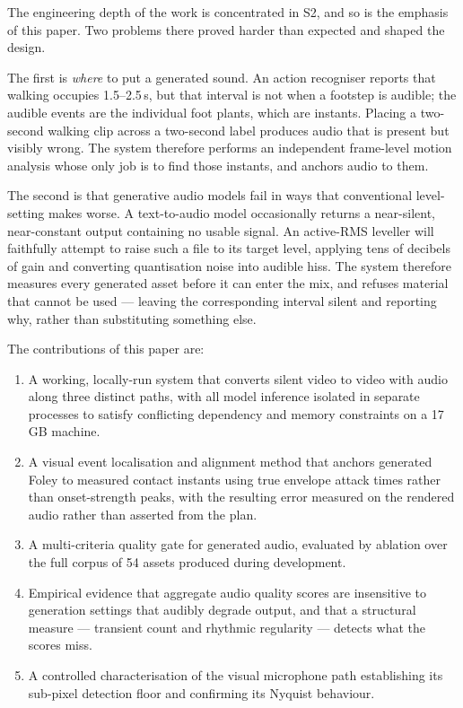 \documentclass[conference]{IEEEtran}
\begin{document}
The engineering depth of the work is concentrated in S2, and so is the emphasis
of this paper. Two problems there proved harder than expected and shaped the
design.

The first is \emph{where} to put a generated sound. An action recogniser reports
that walking occupies 1.5--2.5\,s, but that interval is not when a footstep is
audible; the audible events are the individual foot plants, which are instants.
Placing a two-second walking clip across a two-second label produces audio that
is present but visibly wrong. The system therefore performs an independent
frame-level motion analysis whose only job is to find those instants, and anchors
audio to them.

The second is that generative audio models fail in ways that conventional
level-setting makes worse. A text-to-audio model occasionally returns a
near-silent, near-constant output containing no usable signal. An active-RMS
leveller will faithfully attempt to raise such a file to its target level,
applying tens of decibels of gain and converting quantisation noise into audible
hiss. The system therefore measures every generated asset before it can enter the
mix, and refuses material that cannot be used --- leaving the corresponding
interval silent and reporting why, rather than substituting something else.

The contributions of this paper are:

\begin{enumerate}
\item A working, locally-run system that converts silent video to video with
      audio along three distinct paths, with all model inference isolated in
      separate processes to satisfy conflicting dependency and memory
      constraints on a 17\,GB machine.
\item A visual event localisation and alignment method that anchors generated
      Foley to measured contact instants using true envelope attack times rather
      than onset-strength peaks, with the resulting error measured on the
      rendered audio rather than asserted from the plan.
\item A multi-criteria quality gate for generated audio, evaluated by ablation
      over the full corpus of 54 assets produced during development.
\item Empirical evidence that aggregate audio quality scores are insensitive to
      generation settings that audibly degrade output, and that a structural
      measure --- transient count and rhythmic regularity --- detects what the
      scores miss.
\item A controlled characterisation of the visual microphone path establishing
      its sub-pixel detection floor and confirming its Nyquist behaviour.
\end{enumerate}
\end{document}
